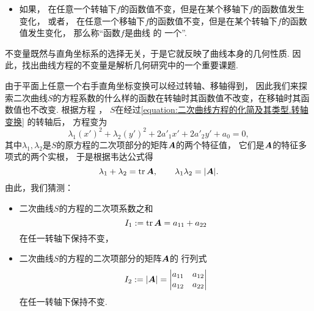 \begin{definition}
\begin{itemize}
	\item 如果，
		在任意一个转轴下\(f\)的函数值不变，但是在某个移轴下\(f\)的函数值发生变化，
		或者，
		在任意一个移轴下\(f\)的函数值不变，但是在某个转轴下\(f\)的函数值发生变化，
	那么称“函数\(f\)是曲线  的
	一个”.
\end{itemize}
\end{definition}

不变量既然与直角坐标系的选择无关，于是它就反映了曲线本身的几何性质.
因此，找出曲线方程的不变量是解析几何研究中的一个重要课题.

由于平面上任意一个右手直角坐标变换可以经过转轴、移轴得到，
因此我们来探索二次曲线\(S\)的方程系数的什么样的函数在转轴时其函数值不改变，在移轴时其函数值也不改变.
根据方程 ，
\(S\)在经过\cref{equation:二次曲线方程的化简及其类型.转轴变换} 的转轴后，
方程变为\begin{equation*}
	\lambda_1 (x')^2 + \lambda_2 (y')^2 + 2 a'_1 x' + 2 a'_2 y' + a_ 0 = 0,
\end{equation*}
其中\(\lambda_1,\lambda_2\)是\(S\)的原方程的二次项部分的矩阵\(\boldsymbol{A}\)的两个特征值，
它们是\(\boldsymbol{A}\)的特征多项式的两个实根，
于是根据韦达公式得\begin{equation*}
	\lambda_1 + \lambda_2 = \tr\boldsymbol{A},
	\qquad
	\lambda_1 \lambda_2 = \abs{\boldsymbol{A}}.
\end{equation*}
由此，我们猜测：\begin{itemize}
	\item 二次曲线\(S\)的方程的二次项系数之和\begin{equation}
		I_1 := \tr\boldsymbol{A}
		= a_{11} + a_{22}
	\end{equation}
	在任一转轴下保持不变，
	\item 二次曲线\(S\)的方程的二次项部分的矩阵\(\boldsymbol{A}\)的
	行列式\begin{equation}
		I_2 := \abs{\boldsymbol{A}}
		= \begin{vmatrix}
			a_{11} & a_{12} \\
			a_{12} & a_{22}
		\end{vmatrix}
	\end{equation}
	在任一转轴下保持不变.
\end{itemize}

